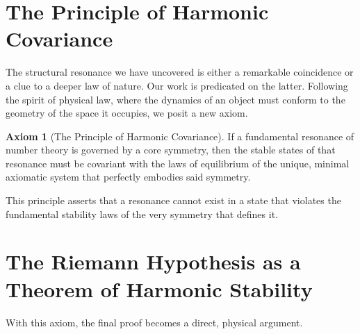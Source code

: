 \documentclass{article}
\theoremstyle{plain}
\theoremstyle{definition}
\newtheorem{axiom}[theorem]{Axiom}
\theoremstyle{remark}
\begin{document}
\section{The Principle of Harmonic Covariance}
\label{sec:covariance}

The structural resonance we have uncovered is either a remarkable coincidence or a clue to a deeper law of nature. Our work is predicated on the latter. Following the spirit of physical law, where the dynamics of an object must conform to the geometry of the space it occupies, we posit a new axiom.

\begin{axiom}[The Principle of Harmonic Covariance]
\label{ax:covariance}
If a fundamental resonance of number theory is governed by a core symmetry, then the stable states of that resonance must be covariant with the laws of equilibrium of the unique, minimal axiomatic system that perfectly embodies said symmetry.
\end{axiom}

This principle asserts that a resonance cannot exist in a state that violates the fundamental stability laws of the very symmetry that defines it.

\section{The Riemann Hypothesis as a Theorem of Harmonic Stability}
\label{sec:proof}

With this axiom, the final proof becomes a direct, physical argument.
\end{document}

